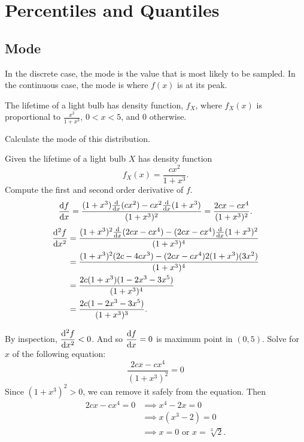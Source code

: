 \section{Percentiles and Quantiles}

\subsection{Mode}
In the discrete case, the mode is the value that is most likely to be sampled. In the continuous 
case, the mode is where $f(x)$ is at its peak.

\begin{example}
    The lifetime of a light bulb has density function, $f_X$, where $f_X(x)$ is proportional to 
    $\displaystyle \frac{x^2}{1 + x^3}$, $0 < x < 5$, and 0 otherwise.

    Calculate the mode of this distribution.
\end{example}
\begin{solution}
    Given the lifetime of a light bulb $X$ has density function
    \[
        f_X(x) =  \frac{cx^2}{1 + x^3}.
    \]
    Compute the first and second order derivative of $f$.
    \begin{align*}
        \odv{f}{x} = \frac{(1+x^3) \odv*{}{x} (cx^2) - cx^2 \odv*{}{x}(1+x^3)}{(1+x^3)^2}
        = \frac{2cx-cx^4}{(1+x^3)^2}.
    \end{align*}
    \begin{align*}
        \odv[order=2]{f}{x} &= \frac{(1+x^3)^2 \odv*{}{x} (2cx - cx^4) - (2cx - cx^4) \odv*{}{x}(1+x^3)^2}{(1+x^3)^4}\\
        &= \frac{(1+x^3)^2 (2c - 4cx^3) - (2cx - cx^4) 2(1+x^3)(3x^2)}{(1+x^3)^4}\\
        &= \frac{2c(1+x^3)(1 - 2x^3 - 3x^5)}{(1+x^3)^4}\\
        &= \frac{2c(1 - 2x^3 - 3x^5)}{(1+x^3)^3}.
    \end{align*}
\end{solution}

By inspection, $\displaystyle \odv[order=2]{f}{x} < 0$. And so $\displaystyle \odv{f}{x} = 0$ is maximum point in $(0, 5)$. Solve 
for $x$ of the following equation:
\[
\frac{2cx-cx^4}{(1+x^3)^2} = 0 
\]
Since $(1+x^3)^2 > 0$, we can remove it safely from the equation. Then 
\begin{align*}
    2cx - cx^4 = 0 &\implies x^4 - 2x = 0\\
    &\implies x(x^3 - 2) = 0\\
    &\implies x = 0 \text{ or } x = \sqrt[3]{2}.
\end{align*}

